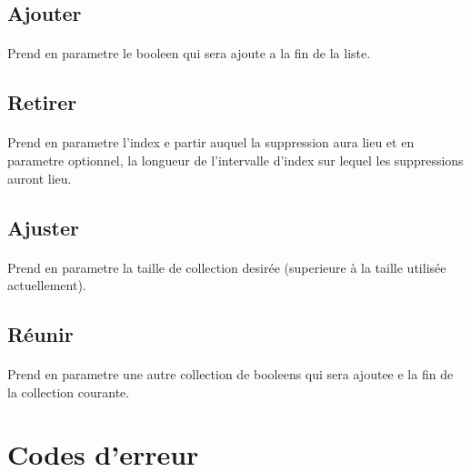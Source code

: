 \documentclass[a4paper, 12pts]{article}
\begin{document}
\subsection{Ajouter}

\paragraph{}
Prend en parametre le booleen qui sera ajoute a la fin de la liste.

\subsection{Retirer}

\paragraph{}
Prend en parametre l'index e partir auquel la suppression aura lieu et en parametre optionnel, la longueur de l'intervalle d'index sur lequel les suppressions auront lieu.

\subsection{Ajuster}

\paragraph{}
Prend en parametre la taille de collection desirée (superieure à la taille utilisée actuellement).

\subsection{Réunir}

\paragraph{}
Prend en parametre une autre collection de booleens qui sera ajoutee e la fin de la collection courante.


\section{Codes d'erreur}
\end{document}
